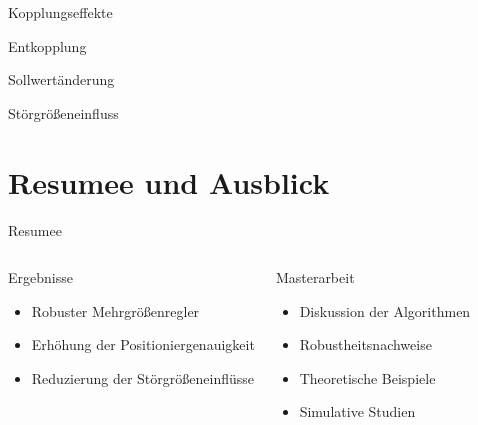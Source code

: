 \documentclass[fleqn,11pt,aspectratio=43]{beamer}
\begin{document}
\begin{frame}{Kopplungseffekte}
\resizebox{\textwidth}{!}{}
\end{frame}

\begin{frame}{Entkopplung}

\end{frame}

\begin{frame}{Sollwertänderung}
\centering
\resizebox{\textwidth}{!}{}
\end{frame}

\begin{frame}{Störgrößeneinfluss}
\centering
\resizebox{\textwidth}{!}{}
\end{frame}


\section{Resumee und Ausblick}

\begin{frame}{Resumee}
\begin{columns}[onlytextwidth]
\begin{exampleblock}{Ergebnisse}
\begin{itemize}
	\item Robuster Mehrgrößenregler
	\item Erhöhung der Positioniergenauigkeit
	\item Reduzierung der Störgrößeneinflüsse
\end{itemize}
\end{exampleblock}

\begin{exampleblock}{Masterarbeit}
\begin{itemize}
	\item Diskussion der Algorithmen
	\item Robustheitsnachweise
	\item Theoretische Beispiele
	\item Simulative Studien
\end{itemize}
\end{exampleblock}
\end{columns}
\end{frame}
\end{document}
